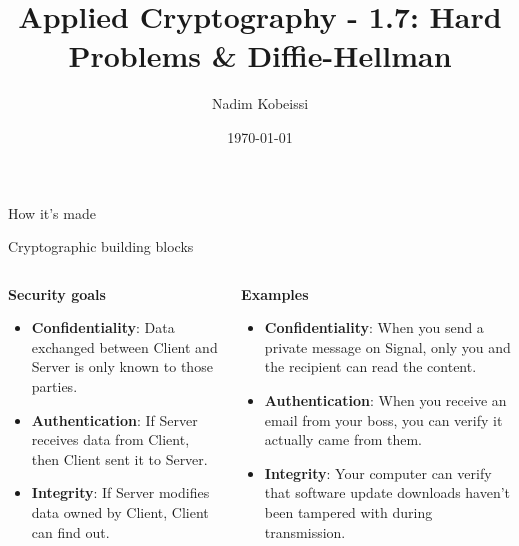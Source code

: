 \documentclass[aspectratio=169, lualatex, handout]{beamer}
\title{Applied Cryptography - 1.7: Hard Problems \& Diffie-Hellman}
\author{Nadim Kobeissi}
\institute{American University of Beirut}
\date{\today}
\begin{document}
\begin{frame}[plain]
	\titlepage
\end{frame}

\begin{frame}{How it's made}
\end{frame}

\begin{frame}{Cryptographic building blocks}
	\begin{columns}[c]
		\begin{column}{0.5\textwidth}
			\textbf{Security goals}
			\begin{itemize}[<+->]
				\item \textbf{Confidentiality}: Data exchanged between Client and Server
				      is only known to those parties.
				\item \textbf{Authentication}: If Server receives data from Client,
				      then Client sent it to Server.
				\item \textbf{Integrity}: If Server modifies data owned by Client,
				      Client can find out.
			\end{itemize}
		\end{column}

		\begin{column}{0.5\textwidth}
			\textbf{Examples}
			\begin{itemize}[<+->]
				\item \textbf{Confidentiality}: When you send a private message on Signal,
				      only you and the recipient can read the content.
				\item \textbf{Authentication}: When you receive an email from your boss,
				      you can verify it actually came from them.
				\item \textbf{Integrity}: Your computer can verify that software update
				      downloads haven't been tampered with during transmission.
			\end{itemize}
		\end{column}
	\end{columns}
\end{frame}
\end{document}
